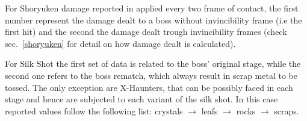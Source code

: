 For Shoryuken damage reported in applied every two frame of contact, the first number represent the damage dealt to a boss without invincibility frame (i.e the first hit) and the second the damage dealt trough invincibility frames (check sec.~\ref{shoryuken} for detail on how damage dealt is calculated).

For Silk Shot the first set of data is related to the boss' original stage, while the second one refers to the boss rematch, which always result in scrap metal to be tossed. The only exception are X-Haunters, that can be possibly faced in each stage and hence are subjected to each variant of the silk shot. In this case reported values follow the following list: crystals $\rightarrow$ leafs $\rightarrow$ rocks $\rightarrow$ scraps.
\begin{table}[htp]
\end{table}

